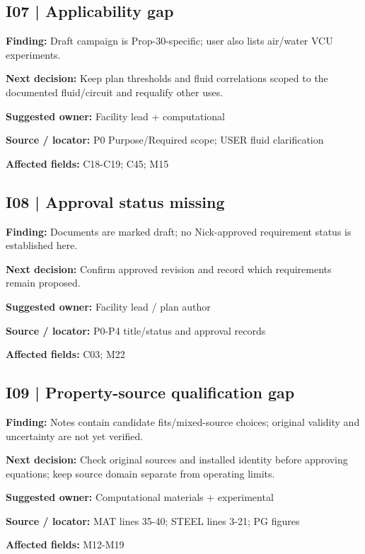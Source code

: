 \documentclass[11pt]{article}
\begin{document}
\par\noindent\begin{minipage}{\textwidth}\small\setlength{\parskip}{2pt}
\subsection*{I07 | Applicability gap}
\textbf{Finding:} Draft campaign is Prop-30-specific; user also lists air/water VCU experiments.\par
\textbf{Next decision:} Keep plan thresholds and fluid correlations scoped to the documented fluid/circuit and requalify other uses.\par
\textbf{Suggested owner:} Facility lead + computational\par
\textbf{Source / locator:} P0 Purpose/Required scope; USER fluid clarification\par
\textbf{Affected fields:} C18-C19; C45; M15\par
\end{minipage}\par\vspace{8pt}
\par\noindent\begin{minipage}{\textwidth}\small\setlength{\parskip}{2pt}
\subsection*{I08 | Approval status missing}
\textbf{Finding:} Documents are marked draft; no Nick-approved requirement status is established here.\par
\textbf{Next decision:} Confirm approved revision and record which requirements remain proposed.\par
\textbf{Suggested owner:} Facility lead / plan author\par
\textbf{Source / locator:} P0-P4 title/status and approval records\par
\textbf{Affected fields:} C03; M22\par
\end{minipage}\par\vspace{8pt}
\par\noindent\begin{minipage}{\textwidth}\small\setlength{\parskip}{2pt}
\subsection*{I09 | Property-source qualification gap}
\textbf{Finding:} Notes contain candidate fits/mixed-source choices; original validity and uncertainty are not yet verified.\par
\textbf{Next decision:} Check original sources and installed identity before approving equations; keep source domain separate from operating limits.\par
\textbf{Suggested owner:} Computational materials + experimental\par
\textbf{Source / locator:} MAT lines 35-40; STEEL lines 3-21; PG figures\par
\textbf{Affected fields:} M12-M19\par
\end{minipage}\par\vspace{8pt}
\end{document}
